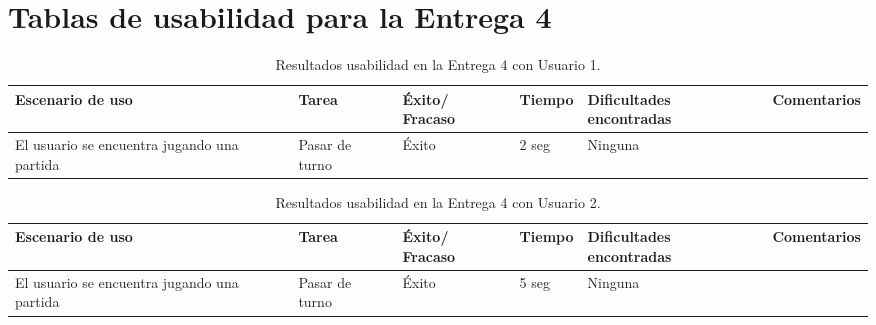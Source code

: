 \section{Tablas de usabilidad para la Entrega 4} \label{tablas-usabilidad-entrega-4}

\begin{table}[h]
  \begin{center}
    \begin{tabular}{|p{2.5cm}|p{1.75cm}|p{1.25cm}|p{1.25cm}|p{2.75cm}|p{3.5cm}|}

      \hline
        \rowcolor{Gray} \textbf{Escenario de uso}
        & \textbf{Tarea}
        & \textbf{Éxito/ Fracaso}
        & \textbf{Tiempo}
        & \textbf{Dificultades encontradas}
        & \textbf{Comentarios}\\

        \hline
        El usuario se encuentra jugando una partida
        & Pasar de turno
        & Éxito
        & 2 seg
        & Ninguna
        &\\

      \hline

    \end{tabular}

    \caption{Resultados usabilidad en la Entrega 4 con Usuario 1.}
    \label{tabla-entrega-4-usuario1}

  \end{center}
\end{table}


\begin{table}[h]
  \begin{center}
    \begin{tabular}{|p{2.5cm}|p{1.75cm}|p{1.25cm}|p{1.25cm}|p{2.75cm}|p{3.5cm}|}

      \hline
        \rowcolor{Gray} \textbf{Escenario de uso}
        & \textbf{Tarea}
        & \textbf{Éxito/ Fracaso}
        & \textbf{Tiempo}
        & \textbf{Dificultades encontradas}
        & \textbf{Comentarios}\\

        \hline
        El usuario se encuentra jugando una partida
        & Pasar de turno
        & Éxito
        & 5 seg
        & Ninguna
        &\\

      \hline

    \end{tabular}

    \caption{Resultados usabilidad en la Entrega 4 con Usuario 2.}
    \label{tabla-entrega-4-usuario2}

  \end{center}
\end{table}


